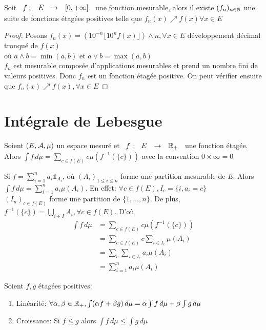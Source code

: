 \documentclass[]{report}
\begin{document}
    \begin{prop}{}{}
        Soit $\begin{array}{ccccc} f : & E & \to & \left[0,+\infty\right] \end{array}$ une fonction mesurable, alors il existe $(f_n)_{n\in\mathbb{N}}$ une suite de fonctions étagées positives telle que $f_n(x)\nearrow f(x)\forall x\in E$
    \end{prop}

    \begin{proof}{}{}
        Posons $f_n(x)=(10^{-n}\lfloor 10^n f(x)\rfloor)\wedge n,\forall x\in E $ développement décimal tronqué de $f(x)$\\
        où $a\wedge b=\min(a,b)$ et $a\lor b=\max(a,b)$\\
        $f_n$ est mesurable composée d'applications mesurables et prend un nombre fini de valeurs positives. Donc $f_n$ est un fonction étagée positive. On peut vérifier ensuite que $f_n(x)\nearrow f(x),\forall x\in E$
    \end{proof}

    \section{Intégrale de Lebesgue}

    \begin{df}{}{}
        Soient $(E,\mathcal{A},\mu)$ un espace mesuré et $\begin{array}{ccccc} f : & E & \to & \mathbb{R}_+ \end{array}$ une fonction étagée. Alors $\int f\, d\mu=\sum_{c\in f(E)}c\mu(f^{-1}(\{c\}))$ avec la convention $0\times\infty=0$
    \end{df}

    \begin{re}{}{}
        Si $f=\sum_{i=1}^{n}a_i\mathbb{1}_{A_i}$, où $(A_i)_{1\le i\le n}$ forme une partition mesurable de $E$. Alors $\int f\, d\mu=\sum_{i=1}^{n}a_i\mu(A_i)$. En effet: $\forall c\in f(E),I_c=\{i,a_i=c\}$\\
        $(I_n)_{c\in f(E)}$ forme une partition de $\{1,\ldots,n\}$. De plus, $f^{-1}(\{c\})=\bigcup_{i\in I}A_i,\forall c\in f(E)$. D'où 
        \begin{align*}
            \int f\, d\mu&=\sum_{c\in f(E)} c\mu(f^{-1}(\{c\}))\\
            &=\sum_{c\in f(E)}c\sum_{i\in I_c}\mu(A_i)\\
            &=\sum_c\sum_{i\in I_c}a_i\mu(A_i)\\
            &=\sum_{i=1}^{n}a_i\mu(A_i)
        \end{align*}
    \end{re}

    \begin{prop}{}{}
        Soient $f,g$ étagées positives:
        \begin{enumerate}
            \item Linéarité: $\forall \alpha,\beta\in\mathbb{R}_+,\int(\alpha f+\beta g)\,d\mu=\alpha\int f\, d\mu+\beta\int g\,d\mu$
            \item Croissance: Si $f\le g$ alors $\int f\, d\mu\le \int g\, d\mu$
        \end{enumerate}
    \end{prop}
\end{document}
